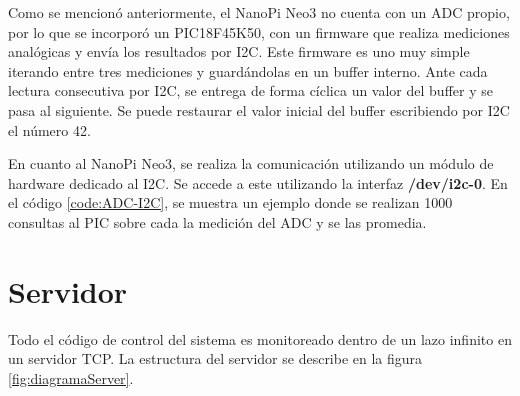 \documentclass[12pt,letterpaper]{article}     %
\begin{document}
Como se mencionó anteriormente, el NanoPi Neo3 no cuenta con un ADC propio, por lo que se incorporó un 
PIC18F45K50, con un firmware que realiza mediciones analógicas y envía los resultados por I2C.
Este firmware es uno muy simple iterando entre tres mediciones y guardándolas en un buffer interno.
Ante cada lectura consecutiva por I2C, se entrega de forma cíclica un valor del buffer y se pasa al siguiente.
Se puede restaurar el valor inicial del buffer escribiendo por I2C el número 42.

En cuanto al NanoPi Neo3, se realiza la comunicación utilizando un módulo de hardware dedicado al I2C.
Se accede a este utilizando la interfaz \textbf{/dev/i2c-0}. En el código \ref{code:ADC-I2C}, se muestra un
ejemplo donde se realizan 1000 consultas al PIC sobre cada la medición del ADC y se las promedia.


\section{Servidor}

Todo el código de control del sistema es monitoreado dentro de un lazo infinito en un servidor TCP.
La estructura del servidor se describe en la figura \ref{fig:diagramaServer}.
\end{document}

